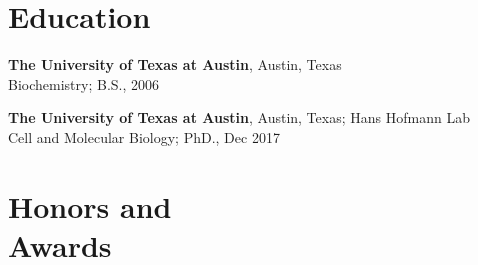 \documentclass[margin,line]{resume}
\begin{document}
\pagestyle{plain}

\begin{resume}




\section{\mysidestyle Education}

\begin{description}[leftmargin=0pt] 
\setlength{\itemsep}{4pt}
\item[] {\bf The University of Texas at Austin}, Austin, Texas \\Biochemistry; B.S., 2006
\item[] {\bf The University of Texas at Austin}, Austin, Texas; Hans Hofmann Lab
\\Cell and Molecular Biology; PhD., Dec 2017
\end{description}
    
 \section{\mysidestyle Honors and \\ Awards} 


\end{resume}
\end{document}
